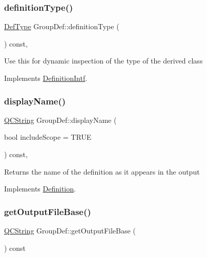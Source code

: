 \subsubsection{\texorpdfstring{definitionType()}{definitionType()}}
{\footnotesize\ttfamily \mbox{\hyperlink{class_definition_intf_ada60114bc621669dd8c19edfc6421766}{Def\+Type}} Group\+Def\+::definition\+Type (\begin{DoxyParamCaption}{ }\end{DoxyParamCaption}) const\hspace{0.3cm}{\ttfamily [inline]}, {\ttfamily [virtual]}}

Use this for dynamic inspection of the type of the derived class 

Implements \mbox{\hyperlink{class_definition_intf_ac8ee00bc1af5558ae37f6896d16f5a3a}{Definition\+Intf}}.

\mbox{\label{class_group_def_a9707ecaf7f4e7231016b68a7e3f811e8}} 
\subsubsection{\texorpdfstring{displayName()}{displayName()}}
{\footnotesize\ttfamily \mbox{\hyperlink{class_q_c_string}{Q\+C\+String}} Group\+Def\+::display\+Name (\begin{DoxyParamCaption}\item[{bool}]{include\+Scope = {\ttfamily TRUE} }\end{DoxyParamCaption}) const\hspace{0.3cm}{\ttfamily [inline]}, {\ttfamily [virtual]}}

Returns the name of the definition as it appears in the output 

Implements \mbox{\hyperlink{class_definition_ac4741f70f06baac174cf71b3e11d06ac}{Definition}}.

\mbox{\label{class_group_def_a6320c7b06b29937039549be13a698e20}} 
\subsubsection{\texorpdfstring{getOutputFileBase()}{getOutputFileBase()}}
{\footnotesize\ttfamily \mbox{\hyperlink{class_q_c_string}{Q\+C\+String}} Group\+Def\+::get\+Output\+File\+Base (\begin{DoxyParamCaption}{ }\end{DoxyParamCaption}) const\hspace{0.3cm}{\ttfamily [virtual]}}

